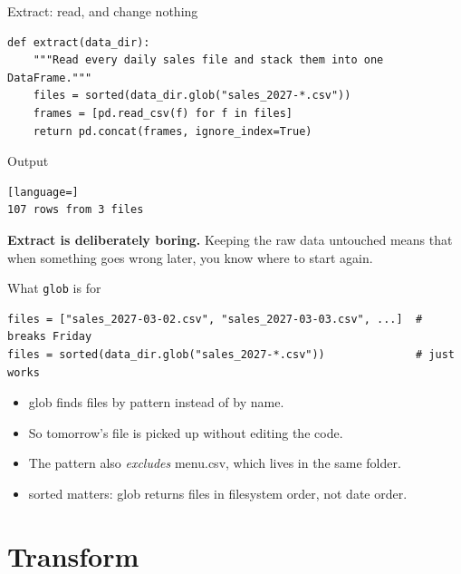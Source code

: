 \documentclass[aspectratio=169,10pt]{beamer}
\newcommand{\py}[1]{{\ttfamily\footnotesize\color{ink}#1}}
\newcommand{\Out}{\vspace{-2pt}\textcolor{muted}{\scriptsize\textsf{Output}}\vspace{-4pt}}
\begin{document}
\begin{frame}[fragile]{Extract: read, and change nothing}
\begin{lstlisting}
def extract(data_dir):
    """Read every daily sales file and stack them into one DataFrame."""
    files = sorted(data_dir.glob("sales_2027-*.csv"))
    frames = [pd.read_csv(f) for f in files]
    return pd.concat(frames, ignore_index=True)
\end{lstlisting}
  \Out
\begin{lstlisting}[language=]
107 rows from 3 files
\end{lstlisting}

  \pause
  \begin{aside}
    \small
    \textbf{Extract is deliberately boring.} Keeping the raw data untouched means that when something
    goes wrong later, you know where to start again.
  \end{aside}
\end{frame}

\begin{frame}[fragile]{What \texttt{glob} is for}
\begin{lstlisting}
files = ["sales_2027-03-02.csv", "sales_2027-03-03.csv", ...]  # breaks Friday
files = sorted(data_dir.glob("sales_2027-*.csv"))              # just works
\end{lstlisting}

  \pause
  \begin{itemize}[<+->]
    \item \py{glob} finds files by \alert{pattern} instead of by name.
    \item So tomorrow's file is picked up without editing the code.
    \item The pattern also \emph{excludes} \py{menu.csv}, which lives in the same folder.
    \item \py{sorted} matters: \py{glob} returns files in filesystem order, not date order.
  \end{itemize}
\end{frame}

\section{Transform}
\end{document}
